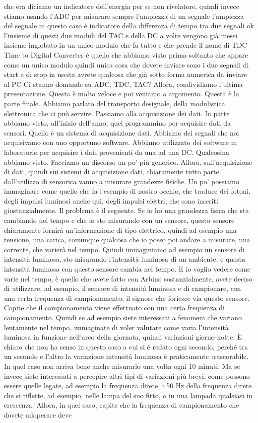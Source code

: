 che era diciamo un indicatore dell'energia per se non rivelatore, quindi invece stiamo usando l'ADC per misurare sempre l'ampiezza di un segnale l'ampiezza del segnale in questo caso è indicatore della differenza di tempo tra due segnali ok l'insieme di questi due moduli del TAC e della DC a volte vengono già messi insieme inglobato in un unico modulo che fa tutto e che prende il nome di TDC Time to Digital Converter è quello che abbiamo visto prima soltanto che appare come un unico modulo quindi unica cosa che dovete inviare sono i due segnali di start e di stop in uscita avrete qualcosa che già sotto forma numerica da inviare al PC Ci stanno domande su ADC, TDC, TAC? Allora, condividiamo l'ultima presentazione. Questa è molto veloce e poi veniamo a argomento. Questa è la parte finale. Abbiamo parlato del transporto designale, della modulistica elettronica che ci può servire. Passiamo alla acquisizione dei dati. In parte abbiamo visto, all'inizio dell'anno, quel programmino per acquisire dati da sensori. Quello è un sistema di acquisizione dati. Abbiamo dei segnali che noi acquisivamo con uno opportuno software. Abbiamo utilizzato dei software in laboratorio per acquisire i dati provenienti da una ad una DC. Qualcosina abbiamo visto. Facciamo un discorso un po' più generico. Allora, sull'acquisizione di dati, quindi sui sistemi di acquisizione dati, chiaramente tutto parte dall'utilizzo di sensorica vanno a misurare grandezze fisiche. Un po' possiamo immaginare come quello che fa l'esempio di nostro occhio, che traduce dei fotoni, degli impulsi luminosi anche qui, degli impulsi elettri, che sono inseriti giustanzialmente. Il problema è il seguente. Se io ho una grandezza fisica che sta cambiando nel tempo e che io sto misurando con un sensore, questo sensore chiaramente fornirà un'informazione di tipo elettrico, quindi ad esempio una tensione, una carica, comunque qualcosa che io posso poi andare a misurare, una corrente, che varierà nel tempo. Quindi immaginiamo ad esempio un sensore di intensità luminosa, sto misurando l'intensità luminosa di un ambiente, e questa intensità luminosa con questo sensore cambia nel tempo. E io voglio vedere come varie nel tempo, è quello che avete fatto con Arbino sostanzialmente, avete deciso di utilizzare, ad esempio, il sensore di intensità luminosa e di campionare, con una certa frequenza di campionamento, il signore che foriesce via questo sensore. Capite che il campionamento viene effettuato con una certa frequenza di campionamento. Quindi se ad esempio siete interessati a fenomeni che variano lentamente nel tempo, immaginate di voler valutare come varia l'intensità luminosa in funzione nell'arco della giornata, quindi variazioni giorno-notte. È chiaro che non ha senso in questo caso a cui si è redato ogni secondo, perché tra un secondo e l'altro la variazione intensità luminosa è praticamente trascorabile. In quel caso non arriva bene anche misurarlo una volta ogni 10 minuti. Ma se invece siete interessati a percepire altri tipi di variazioni più brevi, come possono essere quelle legate, ad esempio la frequenza direte, i 50 Hz della frequenza direte che si riflette, ad esempio, nelle lampa del suo fitto, o in una lampada qualsiasi in crescenza. Allora, in quel caso, capite che la frequenza di campionamento che dovete adoperare deve 